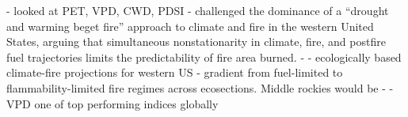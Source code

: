 \documentclass[11p]{article}
\begin{document}
- \citet{abatzoglouImpactAnthropogenicClimate2016} looked at PET, VPD, CWD, PDSI
- \citet{mckenzieClimateChangeEcohydrology2017} challenged the dominance of a “drought and warming beget fire” approach to climate and fire in the western United States, arguing that simultaneous nonstationarity in climate, fire, and postfire fuel trajectories limits the predictability of fire area burned.
- \citet{littellClimateChangeFuture2018} - ecologically based climate-fire projections for western US - gradient from fuel-limited to flammability-limited fire regimes across ecosections. Middle rockies would be
- \citet{zacharakisEnvironmentalForestFire2023} - VPD one of top performing indices globally
\end{document}
